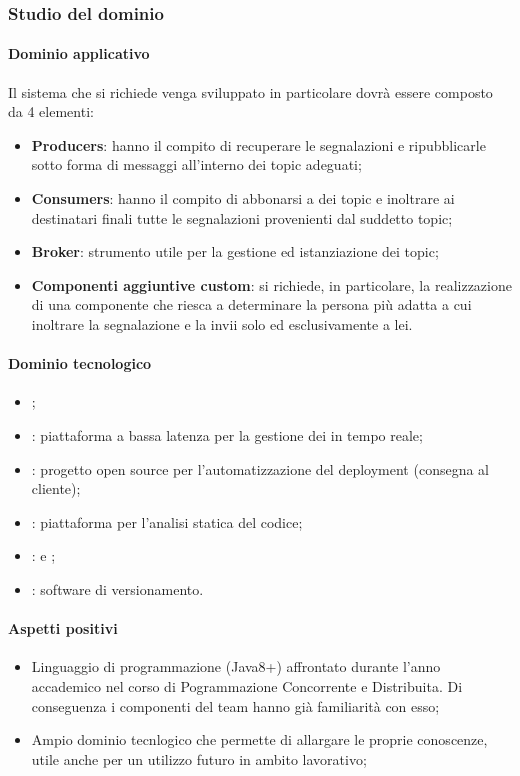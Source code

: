 		\subsubsection{Studio del dominio}
			\paragraph{Dominio applicativo} \Spazio
			Il sistema che si richiede venga sviluppato in particolare dovrà essere composto da 4 elementi:
			\begin{itemize}	 
\item \textbf{{Producers}}: hanno il compito di recuperare le segnalazioni e ripubblicarle sotto forma di messaggi all'interno dei
topic adeguati;
\item \textbf{{Consumers}}: hanno il compito di abbonarsi a dei topic e inoltrare ai destinatari finali tutte le segnalazioni
provenienti dal suddetto topic;
\item \textbf{{Broker}}: strumento utile per la gestione ed istanziazione dei topic;
\item \textbf{{Componenti aggiuntive custom}}: si richiede, in particolare, la realizzazione di una componente che riesca a determinare la persona più adatta a cui inoltrare la segnalazione e la invii solo ed esclusivamente a lei.
			\end{itemize}
			\paragraph{Dominio tecnologico}
			\begin{itemize}
				\item \textbf{}; 
				\item  \textbf{}: piattaforma a bassa latenza per la gestione dei  in tempo reale;
				\item  \textbf{}: progetto open source per l'automatizzazione del deployment (consegna al cliente);
				\item  \textbf{}: piattaforma per l'analisi statica del codice;
				\item  \textbf{}:  e ;
				\item  \textbf{}: software di versionamento.
			\end{itemize}
			
			\paragraph{Aspetti positivi}
				\begin{itemize}
				\item {Linguaggio di programmazione (Java8+) affrontato durante l'anno accademico nel corso di Pogrammazione Concorrente e Distribuita. Di conseguenza i componenti del team hanno già familiarità con esso;}
				\item{Ampio dominio tecnlogico che permette di allargare le proprie conoscenze, utile anche per un utilizzo futuro in ambito lavorativo;}
			\end{itemize}
